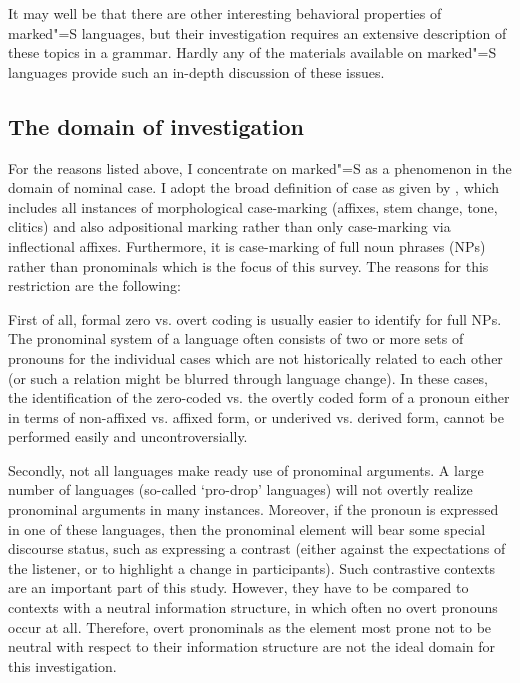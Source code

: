 It may well be that there are other interesting behavioral properties of marked"=S languages, but their investigation requires an extensive description of these topics in a grammar. Hardly any of the materials available on marked"=S languages provide such an in-depth discussion of these issues. 

\subsection{The domain of investigation}\label{invest}

For the reasons listed above, I concentrate on marked"=S as a phenomenon in the domain of nominal case. 
I adopt the broad definition of case  as given by \citet{Bickel.marking}, which includes all instances of morphological case-marking (affixes, stem change, tone, clitics) and also adpositional marking rather than only case-marking via inflectional affixes.
Furthermore, it is case-marking of full noun phrases (NPs) rather than pronominals which is the focus of this survey. 
The reasons for this restriction  are the following:

First of all, formal zero vs. overt coding is usually easier to identify for full NPs. 
The pronominal system of a language often consists of two or more sets of pronouns for the individual cases which are not historically related to each other (or such a relation might be blurred through language change). 
In these cases, the identification of the zero-coded vs. the overtly coded form of a pronoun either in terms of non-affixed vs. affixed form, or underived vs. derived form, cannot be performed easily and uncontroversially.  

Secondly, not all languages make ready use of pronominal arguments. 
A large number of languages (so-called `pro-drop' languages) will not overtly realize pronominal arguments in many instances. 
Moreover, if the pronoun is expressed in one of these languages, then the pronominal element will bear some special discourse status, such as expressing a contrast (either against the expectations of the listener, or to highlight a change in participants). 
Such contrastive contexts are an important part of this study. 
However, they have to be compared to contexts with a neutral information structure, in which often no overt pronouns occur at all. 
Therefore, overt pronominals as the element most prone not to be neutral with respect to their information structure are not the ideal domain for this investigation.

